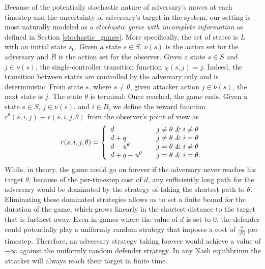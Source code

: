 Because of the potentially stochastic nature of adversary's moves 
at each timestep and the uncertainty of adversary's target in the system, 
our setting is most naturally modeled as a 
\emph{stochastic game with incomplete information} 
as defined in Section \ref{stochastic_games}.
More specifically, the set of states is $L$ with an initial state $s_0$.
Given a state $s \in S$, $\nu(s)$ is the action set 
for the adversary and $B$ is the action set for the 
observer. Given a state $s \in S$ and $j \in \nu(s)$, 
the single-controller transition function $\chi(s,j) = j$. 
Indeed, the transition between states are controlled 
by the adversary only and is deterministic: From state $s$,
where $s\neq \theta$, given attacker action $j \in \nu(s)$,
the next state is $j$. %
The state $\theta$ is terminal: Once reached, the game ends.
Given a state $s \in S$, $j \in \nu(s)$, and $i \in B$, 
we define the reward function $r^\theta(s,i,j) \equiv r(s, i, j, \theta)$ from the observer's point of view as
\begin{align}
r(s, i, j, \theta) = \left\{
        \begin{array}{ll}
            d & \quad j \neq \theta \textsl{ \& } i\neq \theta \\
            d+q & \quad j \neq \theta \textsl{ \& } i=\theta \\
            d-u^{\theta} & \quad j=\theta \textsl{ \& } i\neq \theta \\
           d+q-u^{\theta} & \quad j=\theta \textsl{ \& } i=\theta. \\
        \end{array}
    \right.
\end{align}
While, in theory, the game could go on forever if the adversary never reaches his target $\theta$, 
because of the per-timestep cost of $d$, any sufficiently long path for the adversary would be 
dominated by the strategy of taking the shortest path to $\theta$. 
Eliminating these dominated strategies allows us to set a finite bound for the duration of the game, 
which grows linearly in the shortest distance to the target that is furthest away. Even in games where the value of $d$ is set to 0, the defender could potentially play a uniformly random strategy that imposes a cost of $\frac{q}{| B |}$ per timestep. Therefore, an adversary strategy taking forever would achieve a value of $-\infty$ against the uniformly random defender strategy. In any Nash equilibrium the attacker will always reach their target in finite time.

